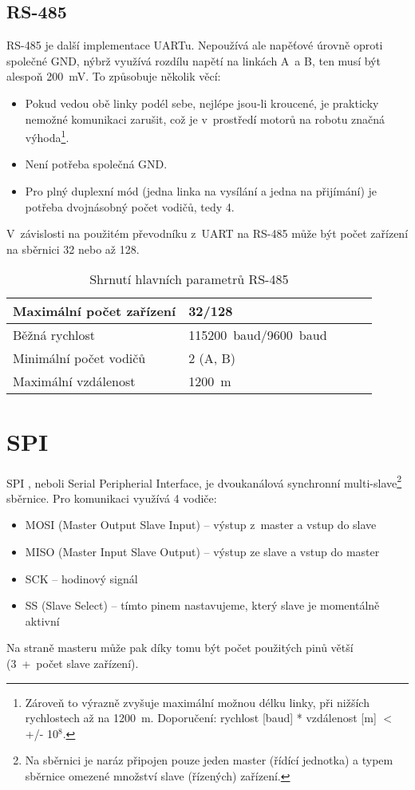 \subsection{RS-485}\label{RS-485} %
RS-485 \cite{RS-485} je další implementace UARTu.
Nepoužívá ale napěťové úrovně oproti společné GND, nýbrž využívá rozdílu napětí na linkách A~a B, ten musí být alespoň 200~mV.
To způsobuje několik věcí:
\begin{itemize}
	\item Pokud vedou obě linky podél sebe, nejlépe jsou-li kroucené, je prakticky nemožné komunikaci zarušit, což je v~prostředí motorů na robotu značná výhoda\footnote{Zároveň to výrazně zvyšuje maximální možnou délku linky, při nižších rychlostech až na 1200~m. Doporučení: rychlost [baud] * vzdálenost [m] $<$ +/- 10$^{8}$.}.  
	\item Není potřeba společná GND.
	\item Pro plný duplexní mód (jedna linka na vysílání a jedna na přijímání) je potřeba dvojnásobný počet vodičů, tedy 4.
\end{itemize}
V~závislosti na použitém převodníku z~UART na RS-485 může být počet zařízení na sběrnici 32 nebo až 128.
\begin{table}[h]
	
	\centering
	\begin{tabular}{|l|l|l|l|l|} \hline
		Maximální počet zařízení      & 32/128              \\ \hline
		Běžná rychlost                & 115200~baud/9600~baud        \\ \hline
		Minimální počet vodičů        & 2 (A, B) \\ \hline
		Maximální vzdálenost		  & 1200~m \\ \hline
	\end{tabular}
	\caption{Shrnutí hlavních parametrů RS-485}
\end{table}

\section{SPI}
SPI \cite{nxp:AN2847}, neboli Serial Peripherial Interface, je dvoukanálová synchronní multi-slave\footnote{Na sběrnici je naráz připojen pouze jeden master (řídící jednotka) a typem sběrnice omezené množství slave (řízených) zařízení.} sběrnice.
Pro komunikaci využívá 4 vodiče:
\begin{itemize}
		\item MOSI (Master Output Slave Input) -- výstup z~master a vstup do slave
		\item MISO (Master Input Slave Output) -- výstup ze slave a vstup do master
		\item SCK -- hodinový signál
		\item SS (Slave Select) -- tímto pinem nastavujeme, který slave je momentálně aktivní
\end{itemize}
Na straně masteru může pak díky tomu být počet použitých pinů větší (3~+~počet slave zařízení).

